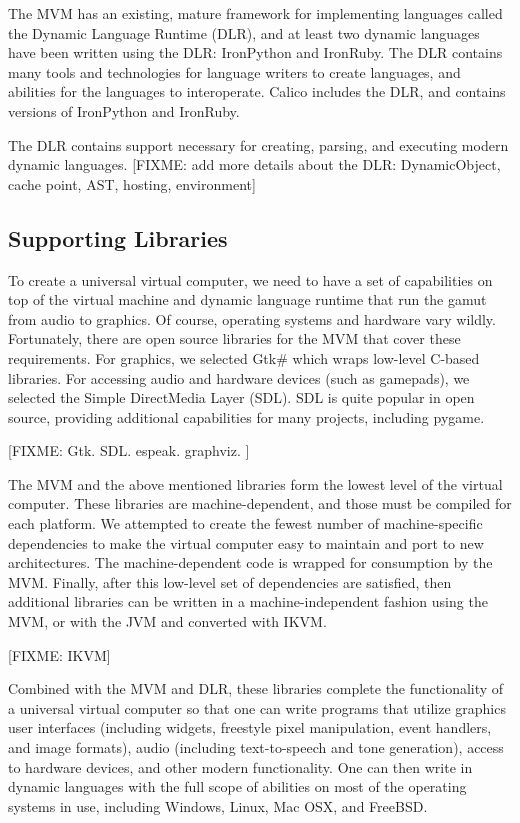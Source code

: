 \documentclass[preprint]{sigplanconf}
\begin{document}
The MVM has an existing, mature framework for implementing languages
called the Dynamic Language Runtime (DLR), and at least two dynamic
languages have been written using the DLR: IronPython and
IronRuby. The DLR contains many tools and technologies for language
writers to create languages, and abilities for the languages to
interoperate. Calico includes the DLR, and contains versions of
IronPython and IronRuby.

The DLR contains support necessary for creating, parsing, and
executing modern dynamic languages. [FIXME: add more details about the
  DLR: DynamicObject, cache point, AST, hosting, environment]

\subsection{Supporting Libraries}

To create a universal virtual computer, we need to have a set of
capabilities on top of the virtual machine and dynamic language
runtime that run the gamut from audio to graphics. Of course,
operating systems and hardware vary wildly. Fortunately, there are
open source libraries for the MVM that cover these requirements. For
graphics, we selected Gtk\# which wraps low-level C-based
libraries. For accessing audio and hardware devices (such as
gamepads), we selected the Simple DirectMedia Layer (SDL). SDL is
quite popular in open source, providing additional capabilities for
many projects, including pygame.

[FIXME: Gtk. SDL. espeak. graphviz. ]

The MVM and the above mentioned libraries form the lowest level of the
virtual computer. These libraries are machine-dependent, and those
must be compiled for each platform. We attempted to create the fewest
number of machine-specific dependencies to make the virtual computer
easy to maintain and port to new architectures. The machine-dependent
code is wrapped for consumption by the MVM. Finally, after this
low-level set of dependencies are satisfied, then additional libraries
can be written in a machine-independent fashion using the MVM, or with
the JVM and converted with IKVM.

[FIXME: IKVM]

Combined with the MVM and DLR, these libraries complete the
functionality of a universal virtual computer so that one can write
programs that utilize graphics user interfaces (including widgets,
freestyle pixel manipulation, event handlers, and image formats),
audio (including text-to-speech and tone generation), access to
hardware devices, and other modern functionality. One can then write
in dynamic languages with the full scope of abilities on most of the
operating systems in use, including Windows, Linux, Mac OSX, and
FreeBSD.
\end{document}
